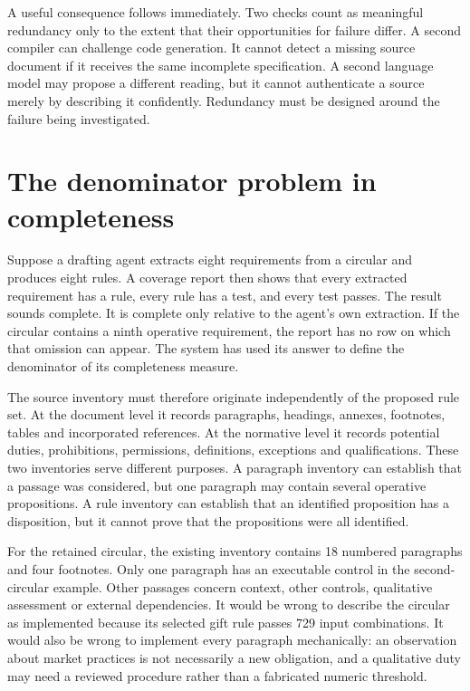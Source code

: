 \documentclass[12pt,a4paper,oneside,openany]{book}
\begin{document}
A useful consequence follows immediately. Two checks count as meaningful
redundancy only to the extent that their opportunities for failure differ. A
second compiler can challenge code generation. It cannot detect a missing source
document if it receives the same incomplete specification. A second language
model may propose a different reading, but it cannot authenticate a source merely
by describing it confidently. Redundancy must be designed around the failure
being investigated.

\section{The denominator problem in completeness}
\label{sec:problem-denominator}
Suppose a drafting agent extracts eight requirements from a circular and produces
eight rules. A coverage report then shows that every extracted requirement has a
rule, every rule has a test, and every test passes. The result sounds complete.
It is complete only relative to the agent's own extraction. If the circular
contains a ninth operative requirement, the report has no row on which that
omission can appear. The system has used its answer to define the denominator
of its completeness measure.

The source inventory must therefore originate independently of the proposed
rule set. At the document level it records paragraphs, headings, annexes,
footnotes, tables and incorporated references. At the normative level it records
potential duties, prohibitions, permissions, definitions, exceptions and
qualifications. These two inventories serve different purposes. A paragraph
inventory can establish that a passage was considered, but one paragraph may
contain several operative propositions. A rule inventory can establish that an
identified proposition has a disposition, but it cannot prove that the
propositions were all identified.

For the retained circular, the existing inventory contains 18 numbered
paragraphs and four footnotes. Only one paragraph has an executable control in
the second-circular example. Other passages concern context, other controls,
qualitative assessment or external dependencies. It would be wrong to describe
the circular as implemented because its selected gift rule passes 729 input
combinations. It would also be wrong to implement every paragraph mechanically:
an observation about market practices is not necessarily a new obligation, and a
qualitative duty may need a reviewed procedure rather than a fabricated numeric
threshold.
\end{document}
